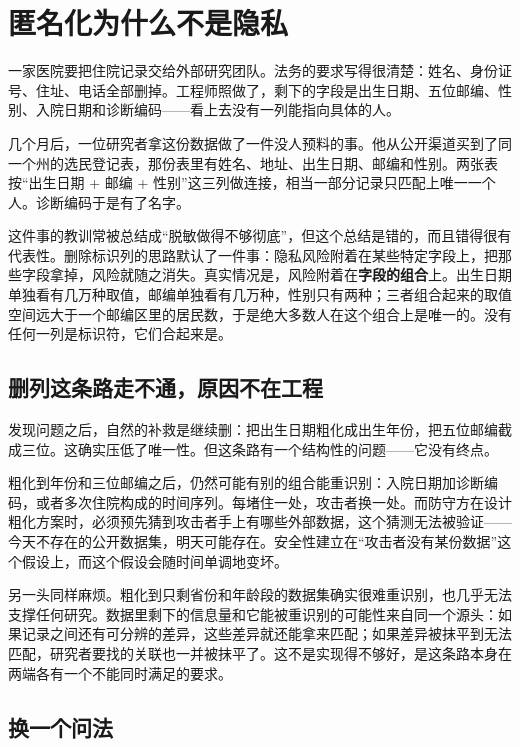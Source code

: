 \section{匿名化为什么不是隐私}
\label{sec:17-Constrained-Guarantees/01-Differential-Privacy/01}

一家医院要把住院记录交给外部研究团队。法务的要求写得很清楚：姓名、身份证号、住址、电话全部删掉。工程师照做了，剩下的字段是出生日期、五位邮编、性别、入院日期和诊断编码——看上去没有一列能指向具体的人。

几个月后，一位研究者拿这份数据做了一件没人预料的事。他从公开渠道买到了同一个州的选民登记表，那份表里有姓名、地址、出生日期、邮编和性别。两张表按``出生日期 + 邮编 + 性别''这三列做连接，相当一部分记录只匹配上唯一一个人。诊断编码于是有了名字。

这件事的教训常被总结成``脱敏做得不够彻底''，但这个总结是错的，而且错得很有代表性。删除标识列的思路默认了一件事：隐私风险附着在某些特定字段上，把那些字段拿掉，风险就随之消失。真实情况是，风险附着在\textbf{字段的组合}上。出生日期单独看有几万种取值，邮编单独看有几万种，性别只有两种；三者组合起来的取值空间远大于一个邮编区里的居民数，于是绝大多数人在这个组合上是唯一的。没有任何一列是标识符，它们合起来是。

\subsection{删列这条路走不通，原因不在工程}

发现问题之后，自然的补救是继续删：把出生日期粗化成出生年份，把五位邮编截成三位。这确实压低了唯一性。但这条路有一个结构性的问题——它没有终点。

粗化到年份和三位邮编之后，仍然可能有别的组合能重识别：入院日期加诊断编码，或者多次住院构成的时间序列。每堵住一处，攻击者换一处。而防守方在设计粗化方案时，必须预先猜到攻击者手上有哪些外部数据，这个猜测无法被验证——今天不存在的公开数据集，明天可能存在。安全性建立在``攻击者没有某份数据''这个假设上，而这个假设会随时间单调地变坏。

另一头同样麻烦。粗化到只剩省份和年龄段的数据集确实很难重识别，也几乎无法支撑任何研究。数据里剩下的信息量和它能被重识别的可能性来自同一个源头：如果记录之间还有可分辨的差异，这些差异就还能拿来匹配；如果差异被抹平到无法匹配，研究者要找的关联也一并被抹平了。这不是实现得不够好，是这条路本身在两端各有一个不能同时满足的要求。

\subsection{换一个问法}

